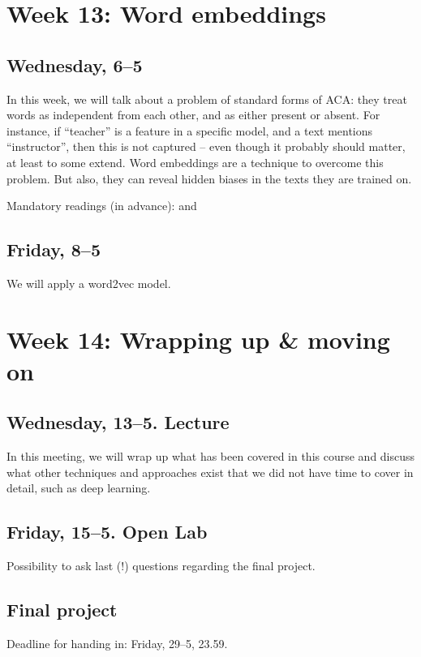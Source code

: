 \section*{Week 13: Word embeddings}

\subsection*{Wednesday, 6--5}
In this week, we will talk about a problem of standard forms of ACA: they treat words as independent from each other, and as either present or absent. For instance, if ``teacher'' is a feature in a specific model, and a text mentions ``instructor'', then this is not captured -- even though it probably should matter, at least to some extend. Word embeddings are a technique to overcome this problem. But also, they can reveal hidden biases in the texts they are trained on.

Mandatory readings (in advance): \cite{Kusner2015} and \cite{Garg2017}



\subsection*{Friday, 8--5}
We will apply a word2vec model.



\section*{Week 14: Wrapping up \& moving on}

\subsection*{Wednesday, 13--5. Lecture}
In this meeting, we will wrap up what has been covered in this course and discuss what other techniques and approaches exist that we did not have time to cover in detail, such as deep learning. 

\subsection*{Friday, 15--5. Open Lab}
Possibility to ask last (!) questions regarding the final project.

\subsection*{Final project}
Deadline for handing in: Friday, 29--5, 23.59.

